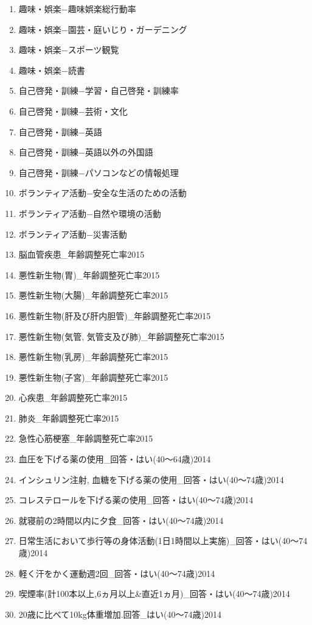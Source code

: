 \begin{multicols}{2}
\begin{enumerate}
  \item 趣味・娯楽−趣味娯楽総行動率
  \item 趣味・娯楽−園芸・庭いじり・ガーデニング
  \item 趣味・娯楽−スポーツ観覧
  \item 趣味・娯楽−読書
  \item 自己啓発・訓練−学習・自己啓発・訓練率
  \item 自己啓発・訓練−芸術・文化
  \item 自己啓発・訓練−英語
  \item 自己啓発・訓練−英語以外の外国語
  \item 自己啓発・訓練−パソコンなどの情報処理
  \item ボランティア活動−安全な生活のための活動
  \item ボランティア活動−自然や環境の活動
  \item ボランティア活動−災害活動
  \item 脳血管疾患\_年齢調整死亡率2015
  \item 悪性新生物(胃)\_年齢調整死亡率2015
  \item 悪性新生物(大腸)\_年齢調整死亡率2015
  \item 悪性新生物(肝及び肝内胆管)\_年齢調整死亡率2015
  \item 悪性新生物(気管, 気管支及び肺)\_年齢調整死亡率2015
  \item 悪性新生物(乳房)\_年齢調整死亡率2015
  \item 悪性新生物(子宮)\_年齢調整死亡率2015
  \item 心疾患\_年齢調整死亡率2015
  \item 肺炎\_年齢調整死亡率2015
  \item 急性心筋梗塞\_年齢調整死亡率2015
  \item 血圧を下げる薬の使用\_回答・はい(40〜64歳)2014
  \item インシュリン注射, 血糖を下げる薬の使用\_回答・はい(40〜74歳)2014
  \item コレステロールを下げる薬の使用\_回答・はい(40〜74歳)2014
  \item 就寝前の2時間以内に夕食\_回答・はい(40〜74歳)2014
  \item 日常生活において歩行等の身体活動(1日1時間以上実施)\_回答・はい(40〜74歳)2014
  \item 軽く汗をかく運動週2回\_回答・はい(40〜74歳)2014
  \item 喫煙率(計100本以上,6ヵ月以上\&直近1ヵ月)\_回答・はい(40〜74歳)2014
  \item 20歳に比べて10kg体重増加.回答\_はい(40〜74歳)2014

\end{enumerate}
\end{multicols}
